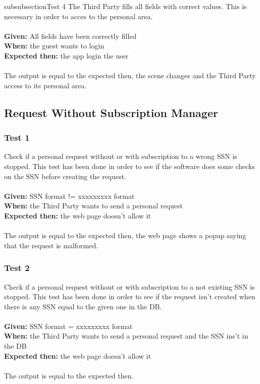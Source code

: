 subsubsection{\Large{Test 4}}
The Third Party fills all fields with correct values. This is necessary in order to acces to the personal area.\\
\\
\textbf{Given: } All fields have been correctly filled\\
\textbf{When: } the guest wants to login\\
\textbf{Expected then: } the app login the user\\
\\
The output is equal to the expected then, the scene changes and the Third Party access to its personal area.

\subsection{Request Without Subscription Manager}

\subsubsection{\Large{Test 1}}
Check if a personal request without or with subscription to a wrong SSN is stopped. This test has been done in order to see if the software does some checks on the SSN before creating the request.\\
\\
\textbf{Given: } SSN format != xxxxxxxxx format\\
\textbf{When: } the Third Party wants to send a personal request\\
\textbf{Expected then: } the web page doesn't allow it\\
\\
The output is equal to the expected then, the web page shows a popup saying that the request is malformed.

\subsubsection{\Large{Test 2}}
Check if a personal request without or with subscription to a not existing SSN is stopped. This test has been done in order to see if the request isn't created when there is any SSN equal to the given one in the DB.\\
\\
\textbf{Given: } SSN format = xxxxxxxxx format \\
\textbf{When: } the Third Party wants to send a personal request and the SSN ins't in the DB\\
\textbf{Expected then: } the web page doesn't allow it\\
\\
The output is equal to the expected then.

